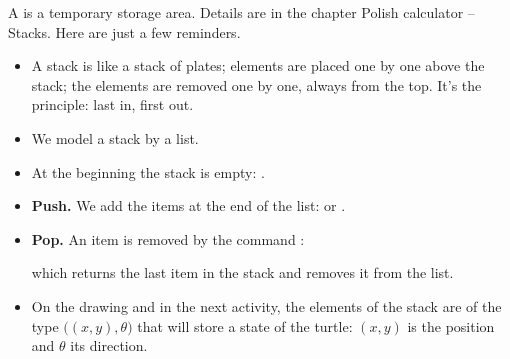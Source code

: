 \documentclass[11pt,class=report,crop=false]{standalone}
\begin{document}
\begin{cours}[Stacks]
A  is a temporary storage area. Details are in the chapter \og{}Polish calculator -- Stacks\fg{}. Here are just a few reminders.



\begin{itemize}
  \item A stack is like a stack of plates; elements are placed one by one above the stack; the elements are removed one by one, always from the top. It's the principle: \og{}last in, first out\fg{}.
  
  \item We model a stack by a list. 
  \item At the beginning the stack is empty: .
  \item \textbf{Push.} We add the items at the end of the list:  or .
  \item \textbf{Pop.} An item is removed by the command :  
  
  which returns the last item in the stack and removes it from the list.
  
  \item On the drawing and in the next activity, the elements of the stack are of the type $\big((x,y),\theta\big)$ that will store a state of the turtle: $(x,y)$ is the position and $\theta$ its direction.
  
\end{itemize}

\end{cours}


\end{document}
